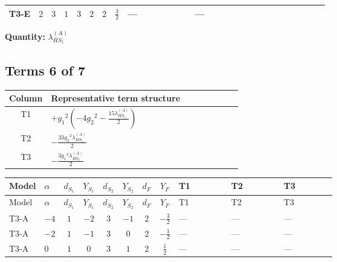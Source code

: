 \documentclass[8pt]{article}
\begin{document}
\begin{landscape}
\begin{longtable}{@{}llcccccc >{\raggedright\arraybackslash}p{0.21\linewidth} >{\raggedright\arraybackslash}p{0.21\linewidth} >{\raggedright\arraybackslash}p{0.21\linewidth}@{}}
\midrule
T3-E & $2$ & $3$ & $1$ & $3$ & $2$ & $2$ & $\frac{3}{2}$ & --- & --- & \scriptsize\adjustbox{max width=\linewidth}{$\begin{gathered} {\lambda_{HS_1}^{(A)}} (2 T_{\nu}^{(1)}+6 \operatorname{Tr}\!\left({Y_d}\,\left({Y_d}\right)^{\dagger}\right)+2 \operatorname{Tr}\!\left({Y_e}\,\left({Y_e}\right)^{\dagger}\right)+6 \operatorname{Tr}\!\left({Y_u}\,\left({Y_u}\right)^{\dagger}\right)+16 {\lambda_{S_1}^{(A)}})\end{gathered}$} \\
\midrule
\bottomrule
\end{longtable}
\clearpage
\noindent\textbf{Quantity: }$\lambda_{HS_1}^{(A)}$\par\smallskip
\subsection*{Terms 6 of 7}
\begin{center}
\begin{tabular}{@{}c >{\raggedright\arraybackslash}p{0.82\linewidth}@{}}
\toprule
Column & Representative term structure \\
\midrule
T1 & \(\displaystyle +{g_1}^2 \left(-4 {g_2}^2-\frac{15 {\lambda_{HS_1}^{(A)}}}{2}\right)\) \\
\midrule
T2 & \(\displaystyle -\frac{33 {g_2}^2 {\lambda_{HS_1}^{(A)}}}{2}\) \\
\midrule
T3 & \(\displaystyle -\frac{3 {g_1}^2 {\lambda_{HS_1}^{(A)}}}{2}\) \\
\midrule
\bottomrule
\end{tabular}
\end{center}
\smallskip
\tiny
\begin{longtable}{@{}llcccccc >{\raggedright\arraybackslash}p{0.21\linewidth} >{\raggedright\arraybackslash}p{0.21\linewidth} >{\raggedright\arraybackslash}p{0.21\linewidth}@{}}
\toprule
Model & $\alpha$ & $d_{S_1}$ & $Y_{S_1}$ & $d_{S_2}$ & $Y_{S_2}$ & $d_F$ & $Y_F$ & T1 & T2 & T3 \\
\midrule
\endfirsthead
\toprule
Model & $\alpha$ & $d_{S_1}$ & $Y_{S_1}$ & $d_{S_2}$ & $Y_{S_2}$ & $d_F$ & $Y_F$ & T1 & T2 & T3 \\
\midrule
\endhead
T3-A & $-4$ & $1$ & $-2$ & $3$ & $-1$ & $2$ & $-\frac{3}{2}$ & --- & --- & --- \\
\midrule
T3-A & $-2$ & $1$ & $-1$ & $3$ & $0$ & $2$ & $-\frac{1}{2}$ & --- & --- & --- \\
\midrule
T3-A & $0$ & $1$ & $0$ & $3$ & $1$ & $2$ & $\frac{1}{2}$ & --- & --- & --- \\

\end{longtable}
\end{landscape}
\end{document}
